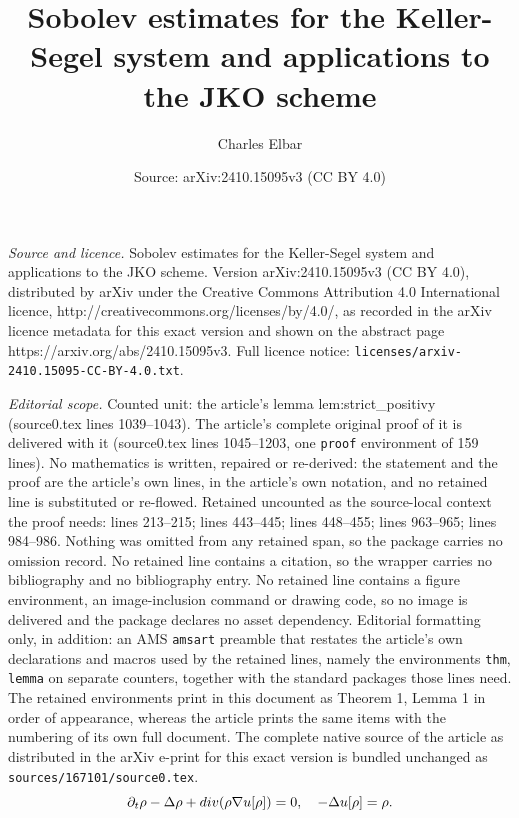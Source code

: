 \documentclass[10pt,a4paper]{amsart}
\title{Sobolev estimates for the Keller-Segel system and applications to the JKO scheme}
\author{Charles Elbar}
\date{Source: arXiv:2410.15095v3 (CC BY 4.0)}
\newcommand {\Div}  { {\rm div} }
\begin{document}
\maketitle

\noindent\emph{Source and licence.} Sobolev estimates for the Keller-Segel system and applications to the JKO scheme. Version arXiv:2410.15095v3 (CC BY 4.0), distributed by arXiv under the Creative Commons Attribution 4.0 International licence, http://creativecommons.org/licenses/by/4.0/, as recorded in the arXiv licence metadata for this exact version and shown on the abstract page https://arxiv.org/abs/2410.15095v3. Full licence notice: \texttt{licenses/arxiv-2410.15095-CC-BY-4.0.txt}.\par\smallskip

\noindent\textit{Editorial scope.} Counted unit: the article's lemma lem:strict\_positivy (source0.tex lines 1039--1043). The article's complete original proof of it is delivered with it (source0.tex lines 1045--1203, one \texttt{proof} environment of 159 lines). No mathematics is written, repaired or re-derived: the statement and the proof are the article's own lines, in the article's own notation, and no retained line is substituted or re-flowed.  Retained uncounted as the source-local context the proof needs: lines 213--215; lines 443--445; lines 448--455; lines 963--965; lines 984--986.  Nothing was omitted from any retained span, so the package carries no omission record.  No retained line contains a citation, so the wrapper carries no bibliography and no bibliography entry.  No retained line contains a figure environment, an image-inclusion command or drawing code, so no image is delivered and the package declares no asset dependency.  Editorial formatting only, in addition: an AMS \texttt{amsart} preamble that restates the article's own declarations and macros used by the retained lines, namely the environments \texttt{thm}, \texttt{lemma} on separate counters, together with the standard packages those lines need.  The retained environments print in this document as Theorem 1, Lemma 1 in order of appearance, whereas the article prints the same items with the numbering of its own full document.  The complete native source of the article as distributed in the arXiv e-print for this exact version is bundled unchanged as \texttt{sources/167101/source0.tex}.
\begin{equation}\label{eq:KS}
\partial_t \rho - \Delta \rho + \Div(\rho\nabla u[\rho]) = 0, \quad -\Delta u[\rho] =\rho.
\end{equation}
\end{document}
